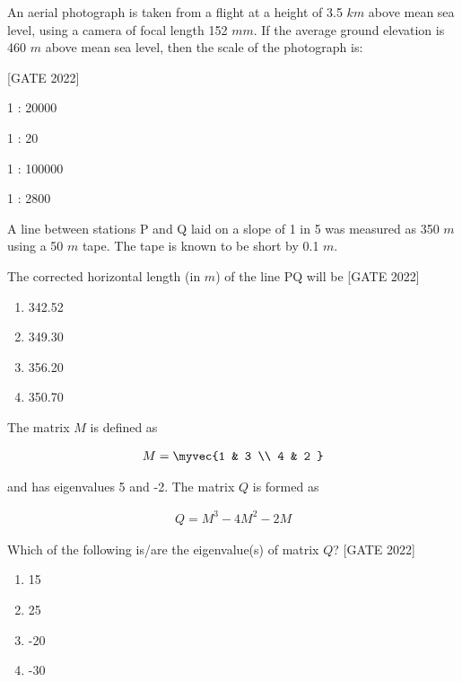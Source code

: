 \item An aerial photograph is taken from a flight at a height of 3.5 $km$ above mean sea level, using a camera of focal length 152 $mm$. If the average ground elevation is 460 $m$ above mean sea level, then the scale of the photograph is:

\hfill{[GATE 2022]}\begin{enumerate}
    \begin{multicols}{2}
        \item 1 : 20000
        \item 1 : 20
        \item 1 : 100000
        \item 1 : 2800
    \end{multicols}
\end{enumerate}

\item A line between stations P and Q laid on a slope of 1 in 5 was measured as 350 $m$ using a 50 $m$ tape. The tape is known to be short by 0.1 $m$.

The corrected horizontal length (in $m$) of the line PQ will be
\hfill{[GATE 2022]}
\begin{multicols}{4}
\begin{enumerate}
    \item 342.52
    \item 349.30
    \item 356.20
    \item 350.70
\end{enumerate}
\end{multicols}

\item The matrix   $M$  is defined as

\begin{align*}
M = \myvec{1 & 3 \\ 4 & 2 }
\end{align*}

and has eigenvalues 5 and -2. The matrix  $ Q  $ is formed as

\begin{align*}
Q = M^3 - 4M^2 - 2M
\end{align*}

Which of the following is/are the eigenvalue(s) of matrix  $ Q  $?
\hfill{[GATE 2022]}
\begin{multicols}{4}
\begin{enumerate}
    \item 15
    \item 25
    \item -20
    \item -30
\end{enumerate}
\end{multicols}

